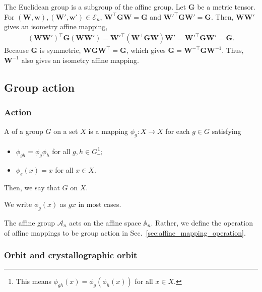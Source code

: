 The Euclidean group is a subgroup of the affine group.
Let $\bm{G}$ be a metric tensor.
For $(\bm{W}, \bm{w}), (\bm{W}', \bm{w}') \in \mathcal{E}_{n}$, $\bm{W}^{\top} \bm{G} \bm{W} = \bm{G}$ and $\bm{W}'^{\top} \bm{G} \bm{W}' = \bm{G}$.
Then, $\bm{W}\bm{W}'$ gives an isometry affine mapping,
\begin{align*}
  (\bm{W}\bm{W}')^{\top} \bm{G} (\bm{W}\bm{W}')
    = \bm{W}'^{\top} (\bm{W}^{\top} \bm{G} \bm{W}) \bm{W}'
    = \bm{W}'^{\top} \bm{G} \bm{W}'
    = \bm{G}.
\end{align*}
Because $\bm{G}$ is symmetric, $\bm{W} \bm{G} \bm{W}^{\top} = \bm{G}$, which gives $\bm{G} = \bm{W}^{-\top} \bm{G} \bm{W}^{-1}$.
Thus, $\bm{W}^{-1}$ also gives an isometry affine mapping.

\subsection{Group action}

\subsubsection{Action}

\begin{screen}
  \begin{defn}[action]
    A  of a group $G$ on a set $X$ is a mapping $\phi_{g}: X \to X$ for each $g \in G$ satisfying
    \begin{itemize}
      \item $\phi_{gh} = \phi_{g} \phi_{h}$ for all $g, h \in G$\footnote{
        This means $\phi_{gh}(x) = \phi_{g} (\phi_{h}(x))$ for all $x \in X$.
      };
      \item $\phi_{e}(x) = x$ for all $x \in X$.
    \end{itemize}
    Then, we say that $G$  on $X$.
  \end{defn}
\end{screen}
We write $\phi_{g}(x)$ as $gx$ in most cases.

The affine group $\mathcal{A}_{n}$ acts on the affine space $\mathbb{A}_{n}$.
Rather, we define the operation of affine mappings to be group action in Sec.~\ref{sec:affine_mapping_operation}.

\subsubsection{Orbit and crystallographic orbit}

